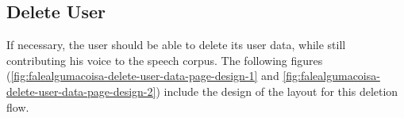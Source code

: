 \subsection{Delete User}

If necessary, the user should be able to delete its user data, while still contributing his voice to the speech corpus. The following figures (\ref{fig:falealgumacoisa-delete-user-data-page-design-1} and \ref{fig:falealgumacoisa-delete-user-data-page-design-2}) include the design of the layout for this deletion flow.

\begin{figure}[h]
    \centering
    \caption{Fale Alguma Coisa Delete User Data steps designs}
    \begin{subfigure}{.5\textwidth}
      \centering

\end{subfigure}
\end{figure}
